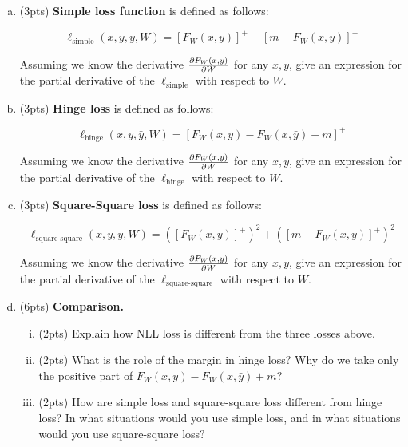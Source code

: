 \begin{enumerate}[(a)]
    \item (3pts) \textbf{Simple loss function} is defined as follows:

          $$
              \ell_\text{simple}(x, y, \bar y, W) = \left[ F_W(x, y)\right]^+ + \left[m - F_W(x, \bar y)\right]^+
          $$

          Assuming we know the derivative $\frac{\partial F_W(x, y)}{\partial W}$ for any $x, y$, give an expression for the partial derivative of the $\ell_\text{simple}$ with respect to $W$.

    \item (3pts) \textbf{Hinge loss} is defined as follows:

          $$
              \ell_\text{hinge}(x, y, \bar y, W) = \left[ F_W(x, y) - F_W(x, \bar y) + m\right ]^+
          $$

          Assuming we know the derivative $\frac{\partial F_W(x, y)}{\partial W}$ for any $x, y$, give an expression for the partial derivative of the $\ell_\text{hinge}$ with respect to $W$.

    \item (3pts) \textbf{Square-Square loss} is defined as follows:

          $$
              \ell_\text{square-square}(x, y, \bar y, W) = \left(\left[ F_W(x, y)\right]^+ \right)^2 + \left( \left[m - F_W(x, \bar y)\right]^+ \right)^2
          $$

          Assuming we know the derivative $\frac{\partial F_W(x, y)}{\partial W}$ for any $x, y$, give an expression for the partial derivative of the $\ell_\text{square-square}$ with respect to $W$.

    \item (6pts) \textbf{Comparison.}
          \begin{enumerate}[(i)]
              \item (2pts) Explain how NLL loss is different from the three losses above.
              \item (2pts) What is the role of the margin in hinge loss? Why do we take only the positive part of $ F_W(x, y) - F_W(x, \bar y) + m$?
              \item (2pts) How are simple loss and square-square loss different from hinge loss? In what situations would you use simple loss, and in what situations would you use square-square loss?
          \end{enumerate}

\end{enumerate}


